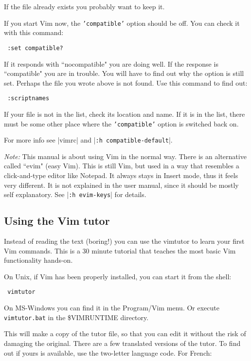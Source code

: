 If the file already exists you probably want to keep it.

If you start Vim now, the \texttt{'compatible'} option should be off.
You can check it with this command:

\begin{verbatim}
 :set compatible?
\end{verbatim}

If it responds with ``nocompatible" you are doing well.
If the response is ``compatible" you are in trouble.
You will have to find out why the option is still set.
Perhaps the file you wrote above is not found.
Use this command to find out:

\begin{verbatim}
 :scriptnames
\end{verbatim}

If your file is not in the list, check its location and name.
If it is in the list, there must be some other place where the \texttt{'compatible'} option is switched back on.

For more info see |vimrc| and |\texttt{:h compatible-default}|.

\textit{Note:}\newline
This manual is about using Vim in the normal way.
There is an alternative called ``evim" (easy Vim).
This is still Vim, but used in a way that resembles a click-and-type editor like Notepad.
It always stays in Insert mode, thus it feels very different.
It is not explained in the user manual, since it should be mostly self explanatory.
See |\texttt{:h evim-keys}| for details.

\subsection{Using the Vim tutor}
\label{tutor}
\label{vimtutor}

Instead of reading the text (boring!) you can use the vimtutor to learn your first Vim commands.
This is a 30 minute tutorial that teaches the most basic Vim functionality hands-on.

On Unix, if Vim has been properly installed, you can start it from the shell:

\begin{verbatim}
 vimtutor
\end{verbatim}

On MS-Windows you can find it in the Program/Vim menu.
Or execute \texttt{vimtutor.bat} in the \$VIMRUNTIME directory.

This will make a copy of the tutor file, so that you can edit it without the risk of damaging the original.
There are a few translated versions of the tutor.
To find out if yours is available, use the two-letter language code.
For French:

